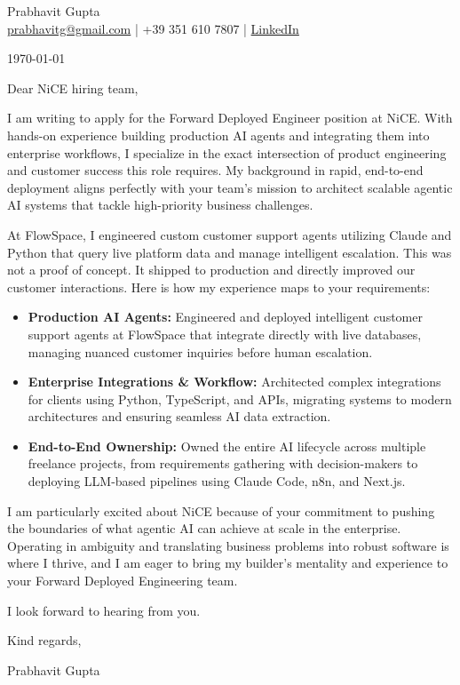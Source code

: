\documentclass{article}\usepackage{geometry}\geometry{a4paper, margin=1in}\usepackage{hyperref}\newcommand{\namesection}[3]{\begin{center}\Huge #2\\[1ex]\large #3\end{center}\vspace{1cm}}\newcommand{\currentdate}[1]{\begin{flushright}#1\end{flushright}\vspace{0.5cm}}\newcommand{\lettercontent}[1]{#1\vspace{1ex}\par}\newcommand{\closing}[1]{#1\vspace{2cm}\par}\newcommand{\signature}[1]{#1}
\begin{document}
\namesection{}{\Huge{Prabhavit Gupta}}{  \href{mailto:prabhavitg@gmail.com}{prabhavitg@gmail.com} | +39 351 610 7807 |  \urlstyle{same}\href{https://www.linkedin.com/in/prabhavit/}{LinkedIn}
}

\currentdate{\today}
\lettercontent{Dear NiCE hiring team,}

\lettercontent{I am writing to apply for the Forward Deployed Engineer position at NiCE. With hands-on experience building production AI agents and integrating them into enterprise workflows, I specialize in the exact intersection of product engineering and customer success this role requires. My background in rapid, end-to-end deployment aligns perfectly with your team's mission to architect scalable agentic AI systems that tackle high-priority business challenges.}

\lettercontent{At FlowSpace, I engineered custom customer support agents utilizing Claude and Python that query live platform data and manage intelligent escalation. This was not a proof of concept. It shipped to production and directly improved our customer interactions. Here is how my experience maps to your requirements:}

{\raggedright\fontsize{11pt}{13pt}\selectfont
\begin{itemize}
    \item \textbf{Production AI Agents:} Engineered and deployed intelligent customer support agents at FlowSpace that integrate directly with live databases, managing nuanced customer inquiries before human escalation.
    \item \textbf{Enterprise Integrations \& Workflow:} Architected complex integrations for clients using Python, TypeScript, and APIs, migrating systems to modern architectures and ensuring seamless AI data extraction.
    \item \textbf{End-to-End Ownership:} Owned the entire AI lifecycle across multiple freelance projects, from requirements gathering with decision-makers to deploying LLM-based pipelines using Claude Code, n8n, and Next.js.
\end{itemize}\par}
\vspace{6pt}

\lettercontent{I am particularly excited about NiCE because of your commitment to pushing the boundaries of what agentic AI can achieve at scale in the enterprise. Operating in ambiguity and translating business problems into robust software is where I thrive, and I am eager to bring my builder's mentality and experience to your Forward Deployed Engineering team.}

\lettercontent{I look forward to hearing from you.}

\begin{flushright}
\closing{Kind regards,}

\signature{Prabhavit Gupta}
\end{flushright}
\end{document}
